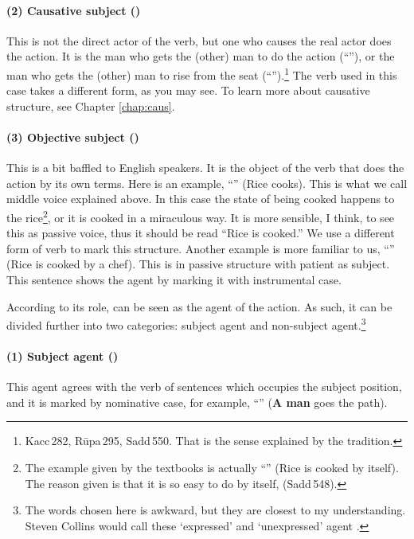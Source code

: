 \paragraph*{(2) Causative subject ()} This is not the direct actor of the verb, but one who causes the real actor does the action. It is the man who gets the (other) man to do the action (``''), or the man who gets the (other) man to rise from the seat (``'').\footnote{Kacc\,282, R\=upa\,295, Sadd\,550. That is the sense explained by the tradition.} The verb used in this case takes a different form, as you may see. To learn more about causative structure, see Chapter \ref{chap:caus}.

\paragraph*{(3) Objective subject ()} This is a bit baffled to English speakers. It is the object of the verb that does the action by its own terms. Here is an example, ``'' (Rice cooks). This is what we call middle voice explained above. In this case the state of being cooked happens to the rice\footnote{The example given by the textbooks is actually ``'' (Rice is cooked by itself). The reason given is that it is so easy to do by itself,  (Sadd\,548).}, or it is cooked in a miraculous way. It is more sensible, I think, to see this as passive voice, thus it should be read ``Rice is cooked.'' We use a different form of verb to mark this structure. Another example is more familiar to us, ``'' (Rice is cooked by a chef). This is in passive structure with patient as subject. This sentence shows the agent by marking it with instrumental case.

\bigskip
According to its role,  can be seen as the agent of the action. As such, it can be divided further into two categories: subject agent and non-subject agent.\footnote{The words chosen here is awkward, but they are closest to my understanding. Steven Collins would call these `expressed' and `unexpressed' agent \citep[p.~143]{collins:grammar}.}

\paragraph*{(1) Subject agent ()} This agent agrees with the verb of sentences which occupies the subject position, and it is marked by nominative case, for example, ``'' (\textbf{A man} goes the path).

